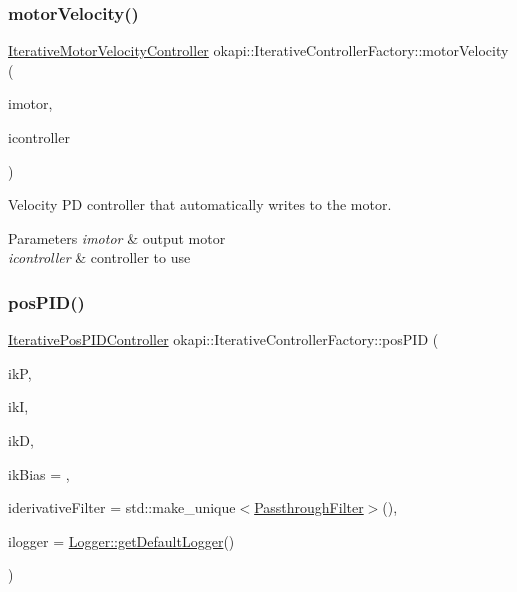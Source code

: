 \subsubsection{\texorpdfstring{motorVelocity()}{motorVelocity()}\hspace{0.1cm}{\footnotesize\ttfamily [4/4]}}
{\footnotesize\ttfamily \mbox{\hyperlink{classokapi_1_1IterativeMotorVelocityController}{Iterative\+Motor\+Velocity\+Controller}} okapi\+::\+Iterative\+Controller\+Factory\+::motor\+Velocity (\begin{DoxyParamCaption}\item[{\mbox{\hyperlink{classokapi_1_1MotorGroup}{Motor\+Group}}}]{imotor,  }\item[{std\+::shared\+\_\+ptr$<$ \mbox{\hyperlink{classokapi_1_1IterativeVelocityController}{Iterative\+Velocity\+Controller}}$<$ double, double $>$$>$}]{icontroller }\end{DoxyParamCaption})\hspace{0.3cm}{\ttfamily [static]}}

Velocity PD controller that automatically writes to the motor.


\begin{DoxyParams}{Parameters}
{\em imotor} & output motor \\
\hline
{\em icontroller} & controller to use \\
\hline
\end{DoxyParams}
\mbox{\label{classokapi_1_1IterativeControllerFactory_a2ff979d01d67cee2c0d86b07690a8081}} 
\subsubsection{\texorpdfstring{posPID()}{posPID()}}
{\footnotesize\ttfamily \mbox{\hyperlink{classokapi_1_1IterativePosPIDController}{Iterative\+Pos\+P\+I\+D\+Controller}} okapi\+::\+Iterative\+Controller\+Factory\+::pos\+P\+ID (\begin{DoxyParamCaption}\item[{double}]{ikP,  }\item[{double}]{ikI,  }\item[{double}]{ikD,  }\item[{double}]{ik\+Bias = {},  }\item[{std\+::unique\+\_\+ptr$<$ \mbox{\hyperlink{classokapi_1_1Filter}{Filter}} $>$}]{iderivative\+Filter = {\ttfamily std\+:\+:make\+\_\+unique$<$\mbox{\hyperlink{classokapi_1_1PassthroughFilter}{Passthrough\+Filter}}$>$()},  }\item[{const std\+::shared\+\_\+ptr$<$ \mbox{\hyperlink{classokapi_1_1Logger}{Logger}} $>$ \&}]{ilogger = {\ttfamily \mbox{\hyperlink{classokapi_1_1Logger_a5053cf778b4b55acba788a3797dc96d2}{Logger\+::get\+Default\+Logger}}()} }\end{DoxyParamCaption})\hspace{0.3cm}{\ttfamily [static]}}

